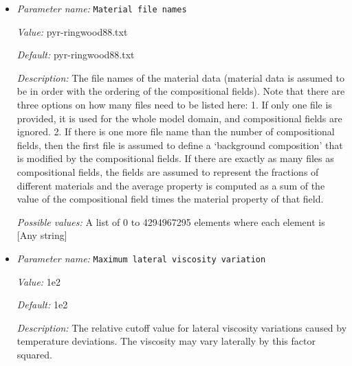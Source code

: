 \begin{itemize}
{\it Value:} temp-viscosity-prefactor.txt


{\it Default:} temp-viscosity-prefactor.txt


{\it Description:} The file name of the lateral viscosity data. 


{\it Possible values:} Any string
\item {\it Parameter name:} {\tt Material file names}
\label{parameters:Material model/Steinberger model/Material file names}
\label{parameters:Material_20model/Steinberger_20model/Material_20file_20names}


{\it Value:} pyr-ringwood88.txt


{\it Default:} pyr-ringwood88.txt


{\it Description:} The file names of the material data (material data is assumed to be in order with the ordering of the compositional fields). Note that there are three options on how many files need to be listed here: 1. If only one file is provided, it is used for the whole model domain, and compositional fields are ignored. 2. If there is one more file name than the number of compositional fields, then the first file is assumed to define a `background composition' that is modified by the compositional fields. If there are exactly as many files as compositional fields, the fields are assumed to represent the fractions of different materials and the average property is computed as a sum of the value of the compositional field times the material property of that field.


{\it Possible values:} A list of 0 to 4294967295 elements where each element is [Any string]
\item {\it Parameter name:} {\tt Maximum lateral viscosity variation}
\label{parameters:Material model/Steinberger model/Maximum lateral viscosity variation}
\label{parameters:Material_20model/Steinberger_20model/Maximum_20lateral_20viscosity_20variation}


{\it Value:} 1e2


{\it Default:} 1e2


{\it Description:} The relative cutoff value for lateral viscosity variations caused by temperature deviations. The viscosity may vary laterally by this factor squared.



\end{itemize}
